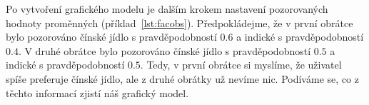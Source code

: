%
%
%
%
%
%

Po vytvoření grafického modelu je dalším krokem nastavení pozorovaných hodnoty proměnných (příklad~\ref{lst:facobs}).
Předpokládejme, že v první obrátce bylo pozorováno čínské jídlo s pravděpodobností $0.6$ a indické s pravděpodobností $0.4$.
V druhé obrátce bylo pozorováno čínské jídlo s pravděpodobností $0.5$ a indické s pravděpodobností $0.5$.
Tedy, v první obrátce si myslíme, že uživatel spíše preferuje čínské jídlo, ale z druhé obrátky už nevíme nic. 
Podíváme se, co z těchto informací zjistí náš grafický model.

